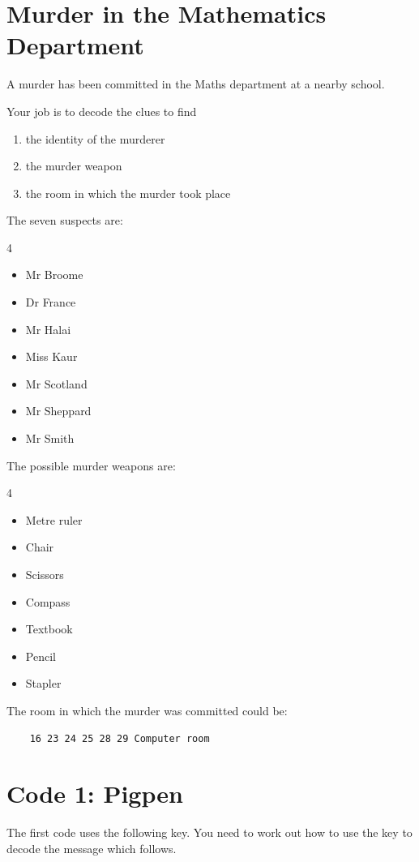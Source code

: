 \documentclass[11pt,a4paper]{report}
\begin{document}
\section*{Murder in the Mathematics Department}
A murder has been committed in the Maths department at a
nearby school.

Your job is to decode the clues to find
\begin{enumerate}
    \item the identity of the murderer
    \item  the murder weapon
   \item the room in which the murder took place

\end{enumerate}

The seven suspects are:
\begin{multicols}{4}
    \begin{itemize}
        \item Mr Broome 
        \item Dr France 
        \item Mr Halai 
        \item Miss Kaur
        \item Mr Scotland 
        \item Mr Sheppard 
        \item Mr Smith
    \end{itemize}
\end{multicols}
The possible murder weapons are:
\begin{multicols}{4}
    \begin{itemize}
        \item Metre ruler 
        \item Chair 
        \item Scissors
        \item Compass 
        \item Textbook 
        \item Pencil
        \item Stapler
    \end{itemize}
\end{multicols}
The room in which the murder was committed could be:
\begin{verbatim}
    16 23 24 25 28 29 Computer room
\end{verbatim}



\newpage

\section*{Code 1: Pigpen}
The first code uses the following key. You need to work out how to use the key
to decode the message which follows.
\end{document}
